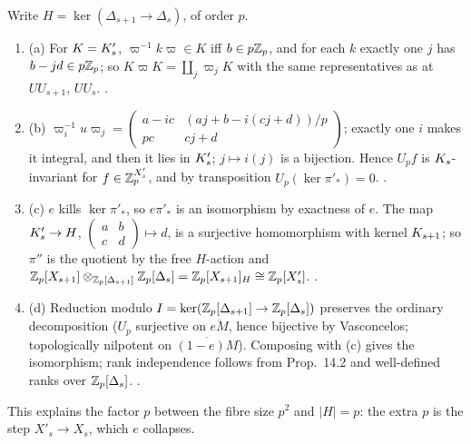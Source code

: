 \begin{outline}
Write $H=\ker(\Delta_{s+1}\to\Delta_s)$, of order $p$.
\begin{enumerate}[label=\arabic*.]
\item (a) For $K=K'_{s}$, $\varpi^{-1}k\varpi\in K$ iff $b\in p\mathbb{Z}_p$, and for each $k$ exactly one $j$ has $b-jd\in p\mathbb{Z}_p$; so
  $K\varpi K=\coprod_j\varpi_jK$ with the same representatives as at $UU_{s+1}$, $UU_s$. \stproved.
\item (b) $\varpi_i^{-1}u\varpi_j=\left(\begin{smallmatrix}a-ic&(aj+b-i(cj+d))/p\\pc&cj+d\end{smallmatrix}\right)$; exactly one $i$ makes it
  integral, and then it lies in $K'_{s}$; $j\mapsto i(j)$ is a bijection. Hence $U_pf$ is $K_{s}$-invariant for $f\in\mathbb{Z}_p^{X'_s}$, and by
  transposition $U_p(\ker\pi'_*)=0$. \stproved.
\item (c) $e$ kills $\ker\pi'_*$, so $e\pi'_*$ is an isomorphism by exactness of $e$. The map $K'_{s}\to H$,
  $\left(\begin{smallmatrix}a&b\\c&d\end{smallmatrix}\right)\mapsto d$, is a surjective homomorphism with kernel $K_{s+1}$; so $\pi''$ is the
  quotient by the free $H$-action and $\mathbb{Z}_p[X_{s+1}]\otimes_{\mathbb{Z}_p[\Delta_{s+1}]}\mathbb{Z}_p[\Delta_s]=\mathbb{Z}_p[X_{s+1}]_H\cong\mathbb{Z}_p[X'_s]$. \stproved.
\item (d) Reduction modulo $I=\ker(\mathbb{Z}_p[\Delta_{s+1}]\to\mathbb{Z}_p[\Delta_s])$ preserves the ordinary decomposition ($U_p$ surjective on
  $\overline{eM}$, hence bijective by Vasconcelos; topologically nilpotent on $\overline{(1-e)M}$). Composing with (c) gives the
  isomorphism; rank independence follows from Prop.~14.2 and well-defined ranks over $\mathbb{Z}_p[\Delta_s]$. \stproved.
\end{enumerate}
This explains the factor $p$ between the fibre size $p^2$ and $|H|=p$: the extra $p$ is the step $X'_s\to X_s$, which $e$ collapses.
\end{outline}

